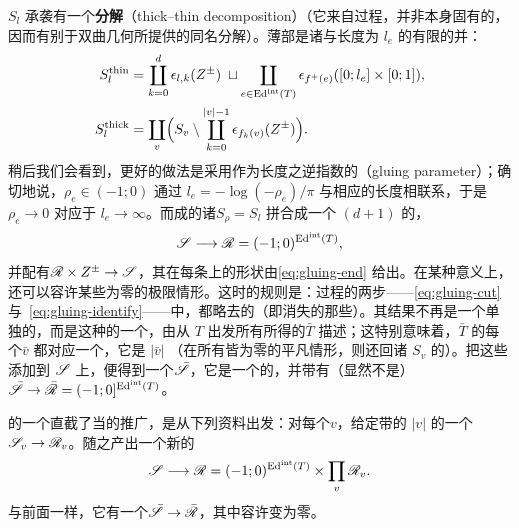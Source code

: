\begin{remark}\label{thm:thick-thin-decomposition}
\trSurface{}$S_l$ 承袭有一个\textbf{\trThickThin{}分解}（thick--thin decomposition）（它来自\trGluing{}过程，并非\trSurface{}本身固有的，因而有别于双曲几何所提供的同名分解）。薄部是诸\trStriplikeEnd{}与长度为 $l_e$ 的有限\trStrip{}的并：
\begin{equation*}
\begin{aligned}
S_l^{\mathrm{thin}}&=\coprod_{k=0}^{d}\epsilon_{l,k}(Z^{\pm})\;\sqcup\coprod_{e\in\mathrm{Ed}^{\mathrm{int}}(T)}\epsilon_{f^+(e)}([0;l_e]\times[0;1]),\\
S_l^{\mathrm{thick}}&=\coprod_{v}\Bigl(S_v\setminus\coprod_{k=0}^{|v|-1}\epsilon_{f_k(v)}(Z^{\pm})\Bigr).
\end{aligned}
\end{equation*}
稍后我们会看到，更好的做法是采用作为长度之逆指数的\textbf{\trGluingParameter}（gluing parameter）；确切地说，$\rho_e\in(-1;0)$ 通过 $l_e=-\log(-\rho_e)/\pi$ 与相应的长度相联系，于是 $\rho_e\to 0$ 对应于 $l_e\to\infty$。\trGluing{}而成的诸\trSurface{}$S_\rho=S_l$ 拼合成一个 $(d+1)$ \trPointedDisc{}的\trFamily，
\begin{equation*}
\mathscr{S}\longrightarrow\mathscr{R}=(-1;0)^{\mathrm{Ed}^{\mathrm{int}}(T)},
\end{equation*}
并配有\trStriplikeEnd{}$\mathscr{R}\times Z^{\pm}\to\mathscr{S}$，其在每条\trFiber{}上的形状由\eqref{eq:gluing-end} 给出。在某种意义上，还可以容许某些\trGluingParameter{}为零的极限情形。这时的规则是：\trGluing{}过程的两步——\eqref{eq:gluing-cut}{}与\ \eqref{eq:gluing-identify}——中，都略去\trDegenerate{}的\trEdge（即\trGluingParameter{}消失的那些）。其结果不再是一个单独的\trPointedDisc，而是这种\trDisk{}的一个\trDisjointUnion，由从 $T$ 出发\trCollapse{}所有\trNondegenerate\trEdge{}所得的\trTree{}$\bar{T}$ 描述；这特别意味着，$\bar{T}$ 的每个\trVertex{}$\bar{v}$ 都对应一个\trConnectedComponent，它是 $|\bar{v}|$ \trPointedDisc（在所有\trGluingParameter{}皆为零的平凡情形，则还回诸 $S_v$ 的\trDisjointUnion）。把这些\trFiber{}添加到 $\mathscr{S}$ 上，便得到一个\trPartialCompactification{}$\bar{\mathscr{S}}$，它是一个\trSmooth{}的\trCorneredBoundary\trManifold，并带有\trSubmersion（显然不是\trFibration）$\bar{\mathscr{S}}\to\bar{\mathscr{R}}=(-1;0]^{\mathrm{Ed}^{\mathrm{int}}(T)}$。
\end{remark}
\trGluingConstruction{}的一个直截了当的推广，是从下列资料出发：对每个\trVertex{}$v$，给定带\trStriplikeEnd{}的 $|v|$ \trPointedDisc{}的一个\trFamily{}$\mathscr{S}_v\to\mathscr{R}_v$。\trGluing{}随之产出一个新的\trFamily
\begin{equation*}
\mathscr{S}\longrightarrow\mathscr{R}=(-1;0)^{\mathrm{Ed}^{\mathrm{int}}(T)}\times\prod_v\mathscr{R}_v.
\end{equation*}
与前面一样，它有一个\trPartialCompactification{}$\bar{\mathscr{S}}\to\bar{\mathscr{R}}$，其中容许\trGluingParameter{}变为零。
